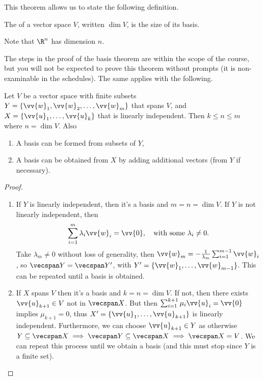 This theorem allows us to state the following definition.

\begin{definition}[Definition]
    The  of a vector space $V$, written $\operatorname{dim} V$, is the size of its basis.
\end{definition}

Note that $\R^n$ has dimension $n$.

The steps in the proof of the basis theorem are within the scope of the course, but you will not be expected to prove this theorem without prompts (it is non-examinable in the schedules). The same applies with the following.


\begin{proposition}
    Let $V$ be a vector space with finite subsets $Y = \{\vv{w}_1, \vv{w}_2, \dots, \vv{w}_m\}$ that spans $V$, and $X = \{\vv{u}_1, \dots, \vv{u}_k \}$ that is linearly independent. Then $k \leq n \leq m$ where $n = \operatorname{dim} V$. Also
    \begin{enumerate}[label=(\roman*)]
        \item A basis can be formed from subsets of $Y$,
        \item A basis can be obtained from $X$ by adding additional vectors (from $Y$ if necessary).
    \end{enumerate}
\end{proposition}
\begin{proof}
    \begin{enumerate}[label=(\roman*)]
        \item If $Y$ is linearly independent, then it's a basis and $m = n = \operatorname{dim} V$. If $Y$ is not linearly independent, then
        $$
        \sum_{i = 1}^m \lambda_i \vv{w}_i = \vv{0}, \quad \text{with some } \lambda_i \neq 0.
        $$
        Take $\lambda_m \neq 0$ without loss of generality, then $\vv{w}_m = -\frac{1}{\lambda_m} \sum_{i = 1}^{m - 1} \vv{w}_i$,
        so $\vecspan Y = \vecspan Y'$, with $Y' = \{\vv{w}_1, \dots, \vv{w}_{m - 1}\}$. This can be repeated until a basis is obtained.
        \item If $X$ spans $V$ then it's a basis and $k = n = \operatorname{dim} V$. If not, then there exists $\vv{u}_{k + 1} \in V$ not in $\vecspan X$. But then $\sum_{i = 1}^{k + 1} \mu_i \vv{u}_i = \vv{0}$ implies $\mu_{k + 1} = 0$, thus $X' = \{\vv{u}_1, \dots, \vv{u}_{k + 1} \}$ is linearly independent. Furthermore, we can choose $\vv{u}_{k + 1} \in Y$ as otherwise $Y \subseteq \vecspan X \implies \vecspan Y \subseteq \vecspan X \implies \vecspan X = V$.
        We can repeat this process until we obtain a basis (and this must stop since $Y$ is a finite set).   \qedhere
    \end{enumerate}
\end{proof}

